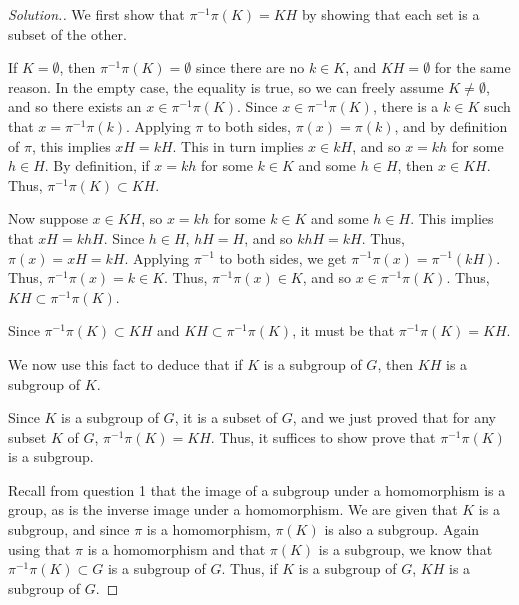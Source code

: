 \documentclass{article}
\newcommand{\sk}{\smallskip}
\begin{document}
\begin{enumerate}
\begin{enumerate}
        \begin{proof}[Solution.]
            We first show that $\pi^{-1}\pi(K) = KH$ by showing that each set is a subset of the other. 

            \sk

            If $K = \emptyset$, then $\pi^{-1}\pi(K) = \emptyset$ since there are no $k \in K$, and $KH = \emptyset$ for the same reason. In the empty case, the equality is true, so we can freely assume $K \neq \emptyset$, and so there exists an $x \in \pi^{-1}\pi(K)$. Since $x \in \pi^{-1}\pi(K)$, there is a $k \in K$ such that $x = \pi^{-1}\pi(k)$. Applying $\pi$ to both sides, $\pi(x) = \pi(k)$, and by definition of $\pi$, this implies $xH = kH$. This in turn implies $x \in kH$, and so $x = kh$ for some $h \in H$. By definition, if $x = kh$ for some $k \in K$ and some $h \in H$, then $x \in KH$. Thus, $\pi^{-1}\pi(K) \subset KH$.

            \sk

            Now suppose $x \in KH$, so $x = kh$ for some $k \in K$ and some $h \in H$. This implies that $xH = khH$. Since $h \in H$, $hH = H$, and so $khH = kH$. Thus, $\pi(x) = xH = kH$. Applying $\pi^{-1}$ to both sides, we get $\pi^{-1}\pi(x) = \pi^{-1}(kH)$. Thus, $\pi^{-1}\pi(x) = k \in K$. Thus, $\pi^{-1}\pi(x) \in K$, and so $x \in \pi^{-1}\pi(K)$. Thus, $KH \subset \pi^{-1}\pi(K)$. 

            \sk

            Since $\pi^{-1}\pi(K) \subset KH$ and $KH \subset \pi^{-1}\pi(K)$, it must be that $\pi^{-1}\pi(K) = KH$.

            \sk

            We now use this fact to deduce that if $K$ is a subgroup of $G$, then $KH$ is a subgroup of $K$. 

            \sk

            Since $K$ is a subgroup of $G$, it is a subset of $G$, and we just proved that for any subset $K$ of $G$, $\pi^{-1}\pi(K) = KH$. Thus, it suffices to show prove that $\pi^{-1}\pi(K)$ is a subgroup.

            \sk

            Recall from question 1 that the image of a subgroup under a homomorphism is a group, as is the inverse image under a homomorphism. We are given that $K$ is a subgroup, and since $\pi$ is a homomorphism, $\pi(K)$ is also a subgroup. Again using that $\pi$ is a homomorphism and that $\pi(K) $ is a subgroup, we know that $\pi^{-1}\pi(K) \subset G$ is a subgroup of $G$. Thus, if $K$ is a subgroup of $G$, $KH$ is a subgroup of $G$.
        \end{proof}
        

\end{enumerate}
\end{enumerate}
\end{document}
